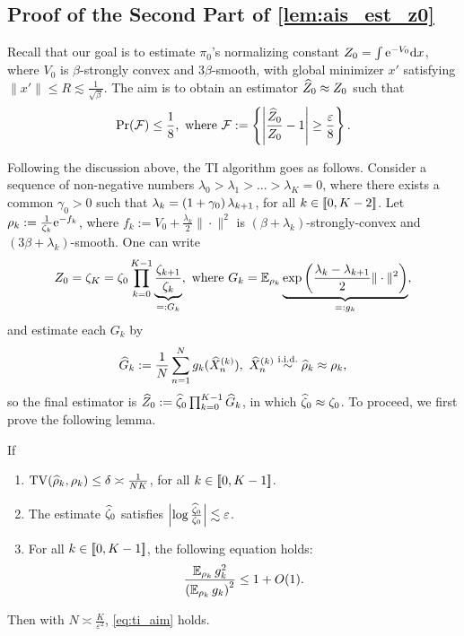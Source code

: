 \subsection{Proof of the Second Part of \cref{lem:ais_est_z0}}
\label{app:rel_work_ti_prf}
Recall that our goal is to estimate $\pi_0$'s normalizing constant $Z_0=\int\mathrm{e}^{-V_0}\mathrm{d} x$, where $V_0$ is $\beta$-strongly convex and $3\beta$-smooth, with global minimizer $x'$ satisfying $\|x'\|\le R\lesssim\frac{1}{\sqrt{\beta}}$. The aim is to obtain an estimator $\widehat{Z}_0\approx Z_0$ such that
\begin{equation}
    \operatorname{Pr}(\mathcal{F})\le\frac{1}{8},~\text{where}~\mathcal{F}:=\left\{\left|\frac{\widehat{Z}_0}{Z_0}-1\right|\ge\frac{\varepsilon}{8}\right\}.
    \label{eq:ti_aim}
\end{equation}

Following the discussion above, the TI algorithm goes as follows. Consider a sequence of non-negative numbers $\lambda_0>\lambda_1>...>\lambda_K=0$, where there exists a common $\gamma_0>0$ such that $\lambda_k=\left(1+\gamma_0\right)\lambda_{k+1}$, for all $k\in\left[\!\left[0,K-2\right]\!\right]$. Let $\rho_k:=\frac{1}{\zeta_k}\mathrm{e}^{-f_k}$, where $f_k:=V_0+\frac{\lambda_k}{2}\|\cdot\|^2$ is $(\beta+\lambda_k)$-strongly-convex and $(3\beta+\lambda_k)$-smooth. One can write
$$Z_0=\zeta_K=\zeta_0\prod_{k=0}^{K-1}\underbrace{\frac{\zeta_{k+1}}{\zeta_k}}_{=:G_k},~\text{where}~G_k=\operatorname{\mathbb{E}}_{\rho_k}\underbrace{\exp\left(\frac{\lambda_k-\lambda_{k+1}}{2}\|\cdot\|^2\right)}_{=:g_k},$$
and estimate each $G_k$ by
$$\widehat{G}_k:=\frac{1}{N}\sum_{n=1}^Ng_k(\widehat{X}_n^{(k)}),~\widehat{X}_n^{(k)}\stackrel{\mathrm{i.i.d.}}{\sim}\widehat{\rho}_k\approx\rho_k,$$
so the final estimator is $\widehat{Z}_0:=\widehat{\zeta}_0\prod_{k=0}^{K-1}\widehat{G}_k$, in which $\widehat{\zeta}_0\approx\zeta_0$. To proceed, we first prove the following lemma.

\begin{lemma}
    If
    \begin{enumerate}[wide=0pt,itemsep=0pt, topsep=0pt,parsep=0pt,partopsep=0pt]
        \item $\operatorname{TV}(\widehat{\rho}_k,\rho_k)\le\delta\asymp\frac{1}{NK}$, for all $k\in\left[\!\left[0,K-1\right]\!\right]$.
        \item The estimate $\widehat{\zeta}_0$ satisfies $\left|\log\frac{\widehat{\zeta}_0}{\zeta_0}\right|\lesssim\varepsilon$.
        \item For all $k\in\left[\!\left[0,K-1\right]\!\right]$, the following equation holds:
              \begin{equation}
                  \frac{\operatorname{\mathbb{E}}_{\rho_k}g_k^2}{\left(\operatorname{\mathbb{E}}_{\rho_k}g_k\right)^2}\le1+O(1).
                  \label{eq:ti_rel_var}
              \end{equation}
    \end{enumerate}
    Then with $N\asymp\frac{K}{\varepsilon^2}$, \cref{eq:ti_aim} holds.
    \label{lem:ti_main}
\end{lemma}

